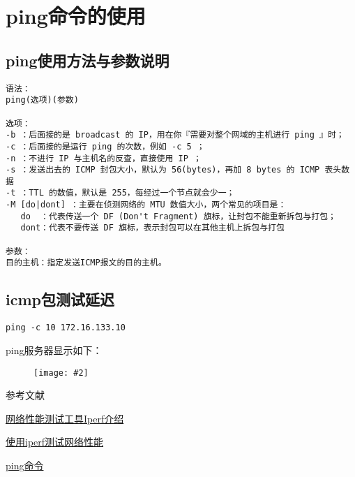 \documentclass[a4paper,left=1.5cm,right=1.5cm,11pt]{article}
\newcommand{\sizedfic}[2]{\begin{figure}[H]
		\center
		\texttt{[image: \#2]}
	\end{figure}}
\def\hang{\hangindent\parindent}
\def\textindent#1{\indent\llap{#1\enspace}\ignorespaces}
\def\re{\par\hang\textindent}
\begin{document}
\section{ping命令的使用}
\subsection{ping使用方法与参数说明}
\begin{lstlisting}
语法：
ping(选项)(参数)

选项：
-b ：后面接的是 broadcast 的 IP，用在你『需要对整个网域的主机进行 ping 』时；
-c ：后面接的是运行 ping 的次数，例如 -c 5 ；
-n ：不进行 IP 与主机名的反查，直接使用 IP ；
-s ：发送出去的 ICMP 封包大小，默认为 56(bytes)，再加 8 bytes 的 ICMP 表头数据
-t ：TTL 的数值，默认是 255，每经过一个节点就会少一；
-M [do|dont] ：主要在侦测网络的 MTU 数值大小，两个常见的项目是：
   do  ：代表传送一个 DF (Don't Fragment) 旗标，让封包不能重新拆包与打包；
   dont：代表不要传送 DF 旗标，表示封包可以在其他主机上拆包与打包

参数：
目的主机：指定发送ICMP报文的目的主机。
\end{lstlisting}
\subsection{icmp包测试延迟}
\begin{lstlisting}
ping -c 10 172.16.133.10
\end{lstlisting}
ping服务器显示如下：
\sizedfic{0.8}{ping1.png}
\clearpage
\begin{center}%
参考文献
\end{center}
\re{[1]} \href{http://www.sdnlab.com/2961.html}{网络性能测试工具Iperf介绍} 
\re{[2]} \href{http://www.51testing.com/html/11/255511-805117.html}{使用iperf测试网络性能}
\re{[3]} \href{http://cn.linux.vbird.org/linux_server/0140networkcommand/0140networkcommand-centos4.php#ping}{ping命令}
\end{document}
